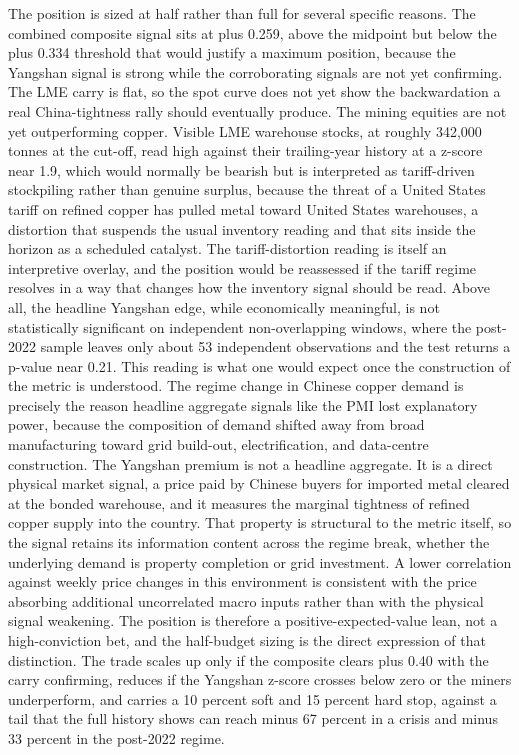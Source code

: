 \documentclass[11pt,a4paper]{article}
\begin{document}
The position is sized at half rather than full for several specific reasons. The combined composite signal sits at plus 0.259, above the midpoint but below the plus 0.334 threshold that would justify a maximum position, because the Yangshan signal is strong while the corroborating signals are not yet confirming. The LME carry is flat, so the spot curve does not yet show the backwardation a real China-tightness rally should eventually produce. The mining equities are not yet outperforming copper. Visible LME warehouse stocks, at roughly 342,000 tonnes at the cut-off, read high against their trailing-year history at a z-score near 1.9, which would normally be bearish but is interpreted as tariff-driven stockpiling rather than genuine surplus, because the threat of a United States tariff on refined copper has pulled metal toward United States warehouses, a distortion that suspends the usual inventory reading and that sits inside the horizon as a scheduled catalyst. The tariff-distortion reading is itself an interpretive overlay, and the position would be reassessed if the tariff regime resolves in a way that changes how the inventory signal should be read. Above all, the headline Yangshan edge, while economically meaningful, is not statistically significant on independent non-overlapping windows, where the post-2022 sample leaves only about 53 independent observations and the test returns a p-value near 0.21. This reading is what one would expect once the construction of the metric is understood. The regime change in Chinese copper demand is precisely the reason headline aggregate signals like the PMI lost explanatory power, because the composition of demand shifted away from broad manufacturing toward grid build-out, electrification, and data-centre construction. The Yangshan premium is not a headline aggregate. It is a direct physical market signal, a price paid by Chinese buyers for imported metal cleared at the bonded warehouse, and it measures the marginal tightness of refined copper supply into the country. That property is structural to the metric itself, so the signal retains its information content across the regime break, whether the underlying demand is property completion or grid investment. A lower correlation against weekly price changes in this environment is consistent with the price absorbing additional uncorrelated macro inputs rather than with the physical signal weakening. The position is therefore a positive-expected-value lean, not a high-conviction bet, and the half-budget sizing is the direct expression of that distinction. The trade scales up only if the composite clears plus 0.40 with the carry confirming, reduces if the Yangshan z-score crosses below zero or the miners underperform, and carries a 10 percent soft and 15 percent hard stop, against a tail that the full history shows can reach minus 67 percent in a crisis and minus 33 percent in the post-2022 regime.
\end{document}
